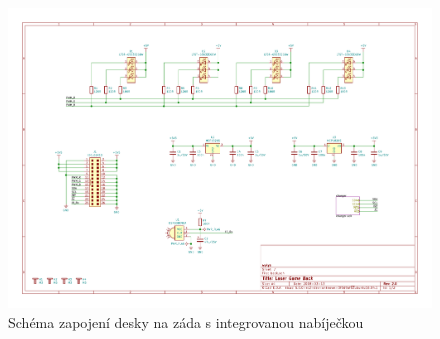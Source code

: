 \begin{landscape}
    \begin{figure}[h]
	    \centering
	    \includegraphics[height=\textwidth]{sch/back}
	    \caption{Schéma zapojení desky na záda s integrovanou nabíječkou}
    \end{figure}
\end{landscape}

